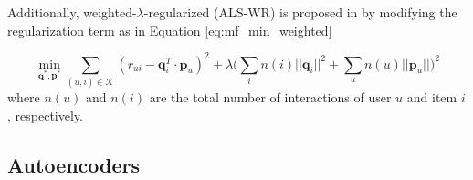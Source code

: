     Additionally, weighted-$\lambda$-regularized (ALS-WR) is proposed in \cite{2008ALSWR} by modifying the regularization term as in Equation \ref{eq:mf_min_weighted}
    
    \begin{equation}
        \label{eq:mf_min_weighted}
        \min_{\mathbf{q}^*, \mathbf{p}^*} \sum_{(u,i) \in \mathcal{K}} (r_{ui} - \mathbf{q}^T_i \cdot \mathbf{p}_u)^2 + \lambda \Big(\sum_i n(i)||\mathbf{q}_i||^2 + \sum_u n(u)||\mathbf{p}_u||\Big)^2
    \end{equation} where $n(u)$ and $n(i)$ are the total number of interactions of user $u$ and item $i$, respectively.

\subsection{Autoencoders}